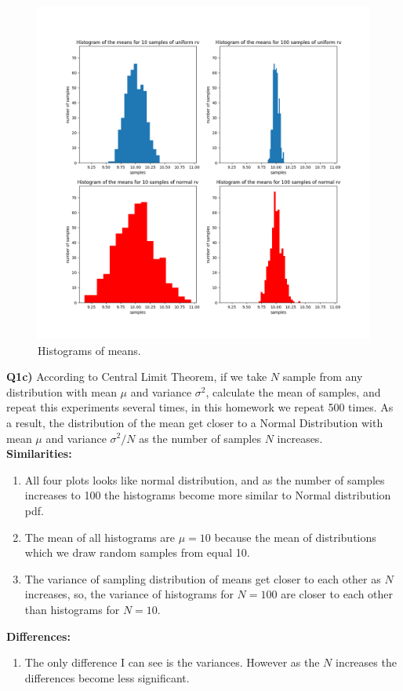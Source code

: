 \documentclass[12pt]{article}
\begin{document}
\begin{figure}[h]
  \centerline{\includegraphics[width=6in]{hists.png}}
  \caption{Histograms of means.}
  \label{fig:Histograms of means}
\end{figure}
\textbf{Q1c)} According to Central Limit Theorem, if we take $N$ sample from any distribution with mean $\mu$ and variance $\sigma^2$, calculate the mean of samples, and repeat this experiments several times, in this homework we repeat 500 times. As a result, the distribution of the mean  get closer to a Normal Distribution with mean $\mu$ and variance $\sigma^2/N$ as the number of samples $N$ increases.\\
\newpage
\textbf{Similarities:}
\begin{enumerate}
\item All four plots looks like normal distribution, and as the number of samples increases to 100 the histograms become more similar to Normal distribution pdf.
\item The mean of all histograms are $\mu=10$ because the mean of distributions which we draw random samples from equal 10.
\item The variance of sampling distribution of means get closer to each other as $N$ increases, so, the variance of histograms for $N=100$ are closer to each other than histograms for $N=10$.
\end{enumerate}
\textbf{Differences:}
\begin{enumerate}
\item The only difference I can see is the variances. However as the $N$ increases the differences become less significant.
\end{enumerate}
\end{document}
